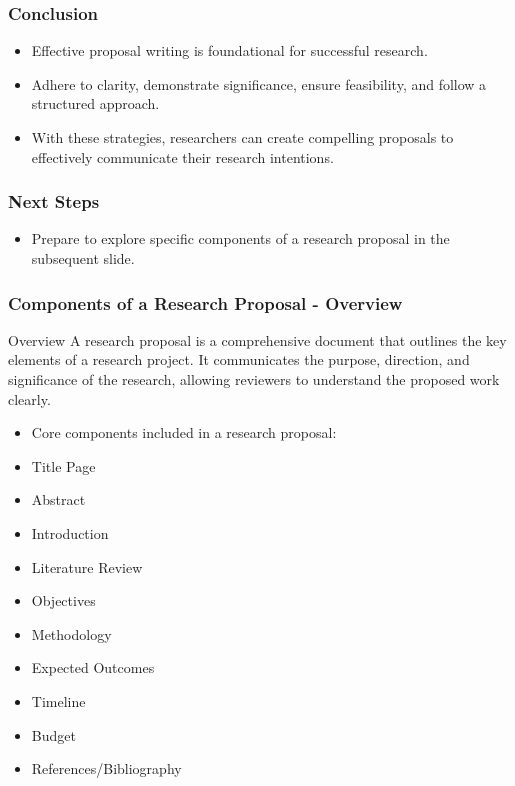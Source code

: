 \documentclass[aspectratio=169]{beamer}
\begin{document}
\begin{frame}[fragile]
    \frametitle{Conclusion}
    \begin{itemize}
        \item Effective proposal writing is foundational for successful research.
        \item Adhere to clarity, demonstrate significance, ensure feasibility, and follow a structured approach.
        \item With these strategies, researchers can create compelling proposals to effectively communicate their research intentions.
    \end{itemize}
\end{frame}

\begin{frame}[fragile]
    \frametitle{Next Steps}
    \begin{itemize}
        \item Prepare to explore specific components of a research proposal in the subsequent slide.
    \end{itemize}
\end{frame}

\begin{frame}[fragile]
    \frametitle{Components of a Research Proposal - Overview}
    \begin{block}{Overview}
        A research proposal is a comprehensive document that outlines the key elements of a research project. It communicates the purpose, direction, and significance of the research, allowing reviewers to understand the proposed work clearly.
    \end{block}
    
    \begin{itemize}
        \item Core components included in a research proposal:
        \item Title Page
        \item Abstract
        \item Introduction
        \item Literature Review
        \item Objectives
        \item Methodology
        \item Expected Outcomes
        \item Timeline
        \item Budget
        \item References/Bibliography
    \end{itemize}
\end{frame}
\end{document}
